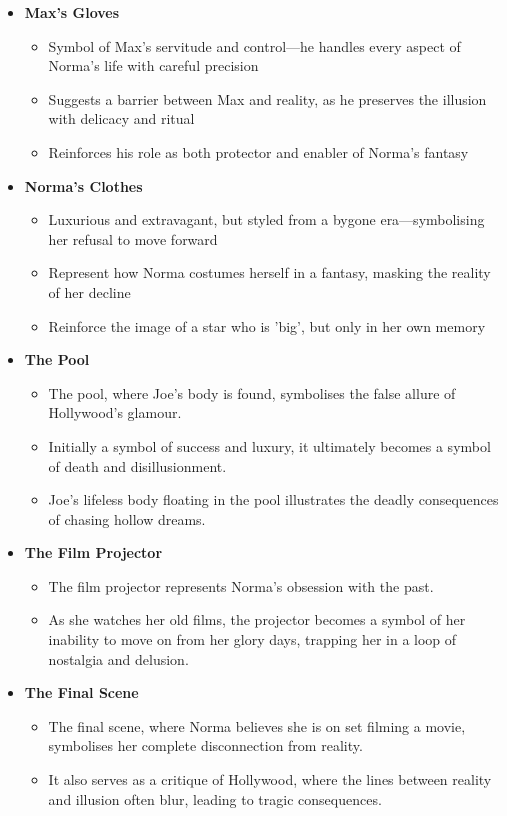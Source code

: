 \documentclass[a4paper]{article}
\begin{document}
\begin{itemize}
\item \textbf{Max’s Gloves}  
    \begin{itemize}
        \item Symbol of Max’s servitude and control—he handles every aspect of Norma’s life with careful precision  
        \item Suggests a barrier between Max and reality, as he preserves the illusion with delicacy and ritual  
        \item Reinforces his role as both protector and enabler of Norma’s fantasy  
    \end{itemize}

\item \textbf{Norma’s Clothes}  
    \begin{itemize}
        \item Luxurious and extravagant, but styled from a bygone era—symbolising her refusal to move forward  
        \item Represent how Norma costumes herself in a fantasy, masking the reality of her decline  
        \item Reinforce the image of a star who is 'big', but only in her own memory  
    \end{itemize}

\item \textbf{The Pool}  
    \begin{itemize}
        \item The pool, where Joe’s body is found, symbolises the false allure of Hollywood’s glamour.
        \item Initially a symbol of success and luxury, it ultimately becomes a symbol of death and disillusionment.
        \item Joe’s lifeless body floating in the pool illustrates the deadly consequences of chasing hollow dreams.  
    \end{itemize}

\item \textbf{The Film Projector}  
    \begin{itemize}
        \item The film projector represents Norma’s obsession with the past.
        \item As she watches her old films, the projector becomes a symbol of her inability to move on from her glory days, trapping her in a loop of nostalgia and delusion. 
    \end{itemize}

\item \textbf{The Final Scene}  
    \begin{itemize}
        \item The final scene, where Norma believes she is on set filming a movie, symbolises her complete disconnection from reality.
        \item It also serves as a critique of Hollywood, where the lines between reality and illusion often blur, leading to tragic consequences.
    \end{itemize}




    
    
\end{itemize}
\end{document}
